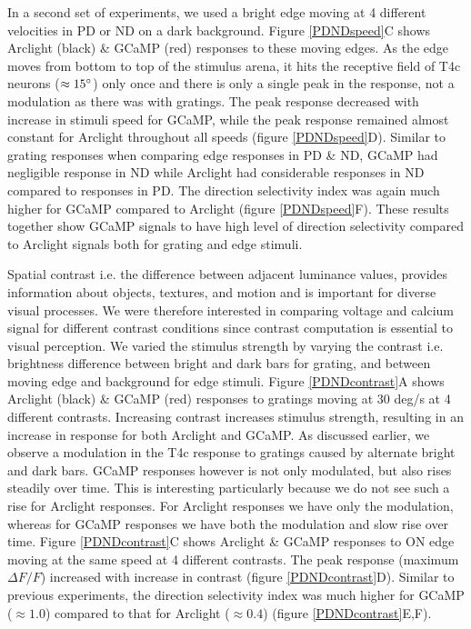 \documentclass[9pt,lineno]{elife}
\begin{document}
In a second set of experiments, we used a bright edge moving at 4 different velocities in PD or ND on a dark background. Figure \ref{PDNDspeed}C shows Arclight (black) \& GCaMP (red) responses to these moving edges. As the edge moves from bottom to top of the stimulus arena, it hits the receptive field of T4c neurons ($\approx15\degree$) only once and there is only a single peak in the response, not a modulation as there was with gratings. The peak response decreased with increase in stimuli speed for GCaMP, while the peak response remained almost constant for Arclight throughout all speeds (figure \ref{PDNDspeed}D). Similar to grating responses when comparing edge responses in PD \& ND, GCaMP had negligible response in ND while Arclight had considerable responses in ND compared to responses in PD. The direction selectivity index was again much higher for GCaMP compared to Arclight (figure \ref{PDNDspeed}F). These results together show GCaMP signals to have high level of direction selectivity compared to Arclight signals both for grating and edge stimuli.

Spatial contrast i.e. the difference between adjacent luminance values, provides information about objects, textures, and motion and is important for diverse visual processes. We were therefore interested in comparing voltage and calcium signal for different contrast conditions since contrast computation is essential to visual perception. We varied the stimulus strength by varying the contrast i.e. brightness difference between bright and dark bars for grating, and between moving edge and background for edge stimuli. Figure \ref{PDNDcontrast}A shows Arclight (black) \& GCaMP (red) responses to gratings moving at 30 deg/s at 4 different contrasts. Increasing contrast increases stimulus strength, resulting in an increase in response for both Arclight and GCaMP. As discussed earlier, we observe a modulation in the T4c response to gratings caused by alternate bright and dark bars. GCaMP responses however is not only modulated, but also rises steadily over time. This is interesting particularly because we do not see such a rise for Arclight responses. For Arclight responses we have only the modulation, whereas for GCaMP responses we have both the modulation and slow rise over time. Figure \ref{PDNDcontrast}C shows Arclight \& GCaMP responses to ON edge moving at the same speed at 4 different contrasts. The peak response (maximum $\Delta F/F$) increased with increase in contrast (figure \ref{PDNDcontrast}D). Similar to previous experiments, the direction selectivity index was much higher for GCaMP ($\approx1.0$) compared to that for Arclight ($\approx0.4$) (figure \ref{PDNDcontrast}E,F). 
\end{document}
